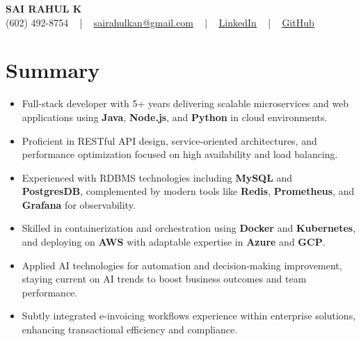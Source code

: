 \documentclass[letterpaper,11pt]{article}
\newcommand{\resumeItem}[1]{
  \item\footnotesize{
    {#1 \vspace{-2pt}}
  }
}
\newcommand{\resumeItemListStart}{\begin{itemize}[leftmargin=*]}
\newcommand{\resumeItemListEnd}{\end{itemize}\vspace{-5pt}}
\begin{document}
\begin{center}
    {\fontsize{14pt}{12pt}\selectfont \textbf{\MakeUppercase{Sai Rahul K}}}\\ \vspace{2pt}
    \fontsize{10pt}{12pt}\selectfont (602) 492-8754 ~ | ~ \href{mailto:sairahulkan@gmail.com}{sairahulkan@gmail.com} ~ | ~
    \href{https://www.linkedin.com/in/rq123/}{\color{blue}\underline{LinkedIn}} ~ | ~
    \href{https://github.com/kanrahuldo}{\color{blue}\underline{GitHub}}~
    \vspace{-8pt}
\end{center}

\section{Summary}
\fontsize{9pt}{10pt}\selectfont
\resumeItemListStart
    \resumeItem{Full-stack developer with 5+ years delivering scalable microservices and web applications using \textbf{Java}, \textbf{Node.js}, and \textbf{Python} in cloud environments.}
    \resumeItem{Proficient in RESTful API design, service-oriented architectures, and performance optimization focused on high availability and load balancing.}
    \resumeItem{Experienced with RDBMS technologies including \textbf{MySQL} and \textbf{PostgresDB}, complemented by modern tools like \textbf{Redis}, \textbf{Prometheus}, and \textbf{Grafana} for observability.}
    \resumeItem{Skilled in containerization and orchestration using \textbf{Docker} and \textbf{Kubernetes}, and deploying on \textbf{AWS} with adaptable expertise in \textbf{Azure} and \textbf{GCP}.}
    \resumeItem{Applied AI technologies for automation and decision-making improvement, staying current on AI trends to boost business outcomes and team performance.}
    \resumeItem{Subtly integrated e-invoicing workflows experience within enterprise solutions, enhancing transactional efficiency and compliance.}
\resumeItemListEnd
\vspace{-6pt}
\end{document}
